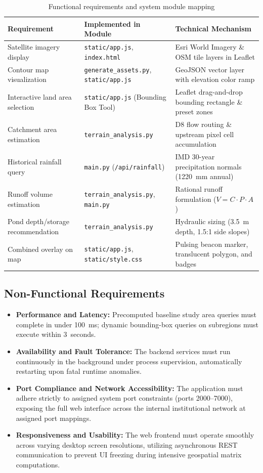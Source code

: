 \documentclass[manuscript,screen,review]{acmart}
\begin{document}
\begin{table}[h]
  \caption{Functional requirements and system module mapping}
  \label{tab:requirements}
  \begin{tabular}{p{4.2cm}p{4.5cm}p{4.5cm}}
    \toprule
    Requirement & Implemented in Module & Technical Mechanism \\
    \midrule
    Satellite imagery display & \texttt{static/app.js}, \texttt{index.html} & Esri World Imagery \& OSM tile layers in Leaflet \\
    Contour map visualization & \texttt{generate\_assets.py}, \texttt{static/app.js} & GeoJSON vector layer with elevation color ramp \\
    Interactive land area selection & \texttt{static/app.js} (Bounding Box Tool) & Leaflet drag-and-drop bounding rectangle \& preset zones \\
    Catchment area estimation & \texttt{terrain\_analysis.py} & D8 flow routing \& upstream pixel cell accumulation \\
    Historical rainfall query & \texttt{main.py} (\texttt{/api/rainfall}) & IMD 30-year precipitation normals (1220~mm annual) \\
    Runoff volume estimation & \texttt{terrain\_analysis.py}, \texttt{main.py} & Rational runoff formulation ($V = C \cdot P \cdot A$) \\
    Pond depth/storage recommendation & \texttt{terrain\_analysis.py} & Hydraulic sizing (3.5~m depth, 1.5:1 side slopes) \\
    Combined overlay on map & \texttt{static/app.js}, \texttt{static/style.css} & Pulsing beacon marker, translucent polygon, and badges \\
    \bottomrule
  \end{tabular}
\end{table}

\subsection{Non-Functional Requirements}
\begin{itemize}
    \item \textbf{Performance and Latency:} Precomputed baseline study area queries must complete in under 100~ms; dynamic bounding-box queries on subregions must execute within 3~seconds.
    \item \textbf{Availability and Fault Tolerance:} The backend services must run continuously in the background under process supervision, automatically restarting upon fatal runtime anomalies.
    \item \textbf{Port Compliance and Network Accessibility:} The application must adhere strictly to assigned system port constraints (ports 2000--7000), exposing the full web interface across the internal institutional network at assigned port mappings.
    \item \textbf{Responsiveness and Usability:} The web frontend must operate smoothly across varying desktop screen resolutions, utilizing asynchronous REST communication to prevent UI freezing during intensive geospatial matrix computations.
\end{itemize}
\end{document}
